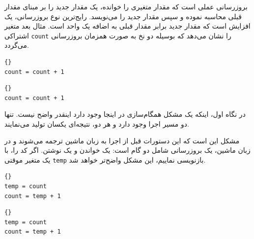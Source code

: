 \documentclass{book}
\begin{document}
    بروزرسانی عملی است که مقدار متغیری را خوانده، یک مقدار جدید را بر مبنای مقدار قبلی محاسبه نموده و سپس مقدار جدید را می‌نویسد. 
    رایج‌ترین نوع بروزرسانی، یک افزایش  است که مقدار جدید برابر مقدار قبلی به اضافه یک واحد است. 
    مثال بعد متغیر اشتراکی \texttt{count} را نشان می‌دهد که بوسیله دو نخ به صورت همزمان بروزرسانی می‌گردد. 

\begin{latin}
\begin{minipage}[t]{2in}
\begin{latin}
\begin{lstlisting}[title=\rl{نخ \lr{A}}]{}
count = count + 1
\end{lstlisting}
\end{latin}
\end{minipage}
\hfill
\begin{minipage}[t]{2in}
\begin{latin}
\begin{lstlisting}[title=\rl{نخ \lr{B}}]{}
count = count + 1
\end{lstlisting}
\end{latin}
\end{minipage}
\end{latin}

    در نگاه اول، اینکه یک مشکل همگام‌سازی در اینجا وجود دارد اینقدر واضح نیست. 
    تنها دو مسیر اجرا وجود دارد و هر دو، نتیجه‌ای یکسان تولید می‌نمایند. 
    
    مشکل این است که این دستورات قبل از اجرا به زبان ماشین ترجمه می‌شوند و در زبان ماشین، یک بروزرسانی شامل دو گام است: یک خواندن 
    و یک نوشتن. اگر کد را، با یک متغیر موقتی \texttt{temp} بازنویسی نماییم، این مشکل واضح‌تر خواهد شد. 

\begin{latin}
\begin{minipage}[t]{2in}
\begin{latin}
\begin{lstlisting}[title=\rl{نخ \lr{A}}]{}
temp = count
count = temp + 1
\end{lstlisting}
\end{latin}
\end{minipage}
\hfill
\begin{minipage}[t]{2in}
\begin{latin}
\begin{lstlisting}[title=\rl{نخ \lr{B}}]{}
temp = count
count = temp + 1
\end{lstlisting}
\end{latin}
\end{minipage}
\end{latin}
\end{document}
